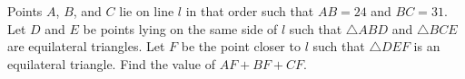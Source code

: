 Points $A$, $B$, and $C$ lie on line $l$ in that order such that $AB=24$ and $BC=31$. Let $D$ and $E$ be points lying on the same side of $l$ such that $\triangle ABD$ and $\triangle BCE$ are equilateral triangles. Let $F$ be the point closer to $l$ such that $\triangle DEF$ is an equilateral triangle. Find the value of $AF+BF+CF$.
